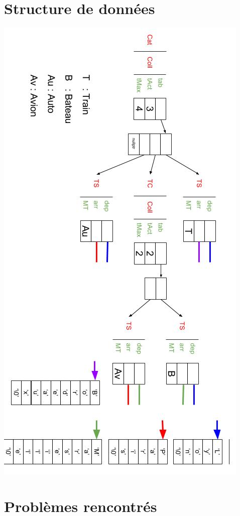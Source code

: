 \documentclass[10pt,a4paper,twoside]{article}
\begin{document}
\section{Structure de données}
\includegraphics[scale=0.7]{dessin_memoire_TP_POO_2.jpg} 

\newpage
\section{Problèmes rencontrés}
\end{document}

